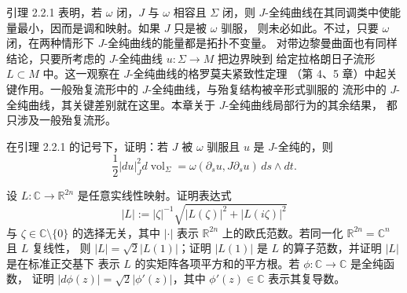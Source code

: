 引理 2.2.1 表明，若 $\omega$ 闭，$J$ 与 $\omega$ 相容且 $\Sigma$ 闭，则
$J$-全纯曲线在其同调类中使能量最小，因而是调和映射。如果 $J$ 只是被 $\omega$ 驯服，
则未必如此。不过，只要 $\omega$ 闭，在两种情形下 $J$-全纯曲线的能量都是拓扑不变量。
对带边黎曼曲面也有同样结论，只要所考虑的 $J$-全纯曲线 $u:\Sigma\to M$ 把边界映到
给定拉格朗日子流形 $L\subset M$ 中。这一观察在 $J$-全纯曲线的格罗莫夫紧致性定理
（第 4、5 章）中起关键作用。一般殆复流形中的 $J$-全纯曲线，与殆复结构被辛形式驯服的
流形中的 $J$-全纯曲线，其关键差别就在这里。本章关于 $J$-全纯曲线局部行为的其余结果，
都只涉及一般殆复流形。

\begin{exercise}\label{ex:2-2-2}
在引理 2.2.1 的记号下，证明：若 $J$ 被 $\omega$ 驯服且 $u$ 是 $J$-全纯的，则
\begin{equation}\label{eq:2-2-4}
  \frac12|du|_J^2d\operatorname{vol}_\Sigma
  =\omega(\partial_su,J\partial_su)\,ds\wedge dt.
\end{equation}
\end{exercise}

\begin{exercise}\label{ex:2-2-3}
设 $L:\mathbb C\to\mathbb R^{2n}$ 是任意实线性映射。证明表达式
\[
  |L|:=|\zeta|^{-1}\sqrt{|L(\zeta)|^2+|L(i\zeta)|^2}
\]
与 $\zeta\in\mathbb C\setminus\{0\}$ 的选择无关，其中 $|\cdot|$ 表示
$\mathbb R^{2n}$ 上的欧氏范数。若同一化 $\mathbb R^{2n}=\mathbb C^n$ 且 $L$ 复线性，
则 $|L|=\sqrt2|L(1)|$；证明 $|L(1)|$ 是 $L$ 的算子范数，并证明 $|L|$ 是在标准正交基下
表示 $L$ 的实矩阵各项平方和的平方根。若 $\phi:\mathbb C\to\mathbb C$ 是全纯函数，
证明 $|d\phi(z)|=\sqrt2|\phi'(z)|$，其中 $\phi'(z)\in\mathbb C$ 表示其复导数。
\end{exercise}
